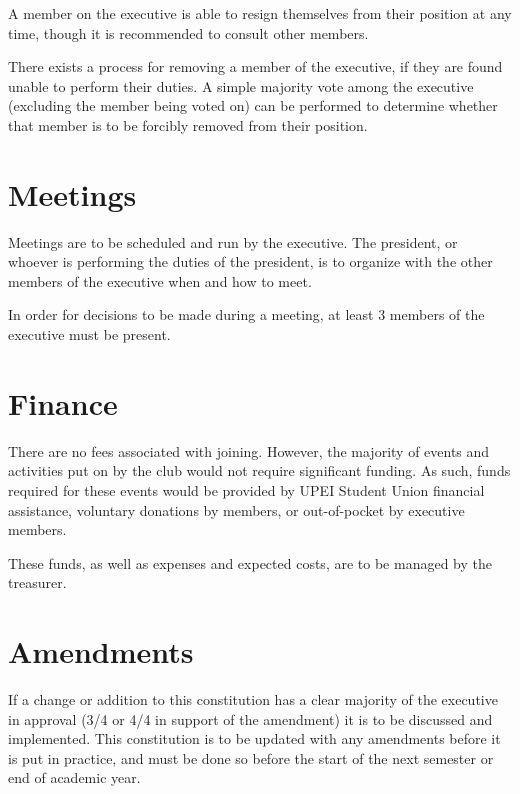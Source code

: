 \documentclass[11pt]{article}
\begin{document}
A member on the executive is able to resign themselves from their position at any time, though it is recommended to consult other members.

\vspace{2mm}
\noindent
There exists a process for removing a member of the executive, if they are found unable to perform their duties. A simple majority vote among the executive (excluding the member being voted on) can be performed to determine whether that member is to be forcibly removed from their position.

\section{Meetings}

Meetings are to be scheduled and run by the executive. The president, or whoever is performing the duties of the president, is to organize with the other members of the executive when and how to meet.

\vspace{2mm}
\noindent
In order for decisions to be made during a meeting, at least 3 members of the executive must be present.

\section{Finance}

There are no fees associated with joining. However, the majority of events and activities put on by the club would not require significant funding. As such, funds required for these events would be provided by UPEI Student Union financial assistance, voluntary donations by members, or out-of-pocket by executive members.

\vspace{2mm}
\noindent
These funds, as well as expenses and expected costs, are to be managed by the treasurer.

\section{Amendments}

If a change or addition to this constitution has a clear majority of the executive in approval (3/4 or 4/4 in support of the amendment) it is to be discussed and implemented. This constitution is to be updated with any amendments before it is put in practice, and must be done so before the start of the next semester or end of academic year.
\end{document}
